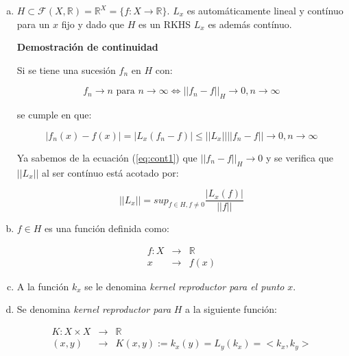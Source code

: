 \documentclass[12pt]{article}
\begin{document}
\begin{enumerate}[(a)]
\item {\color{red} $H \subset \mathcal{F}(X,\mathbb{R})=\mathbb{R}^X=\{f:X \rightarrow \mathbb{R}\}$}. $L_x$ es automáticamente lineal y contínuo para un $x$ fijo y dado que $H$ es un RKHS $L_x$ es además contínuo.

\textbf{Demostración de continuidad}

Si se tiene una sucesión ${f_n}$ en $H$ con:

\begin{equation}
\label{eq:cont1}
f_n \rightarrow n \text{ para } n \rightarrow \infty 
\Longleftrightarrow ||f_n-f||_H \rightarrow 0, n\rightarrow \infty
\end{equation}

se cumple en que:

\begin{equation*}
|f_n(x) - f(x) | = | L_x(f_n-f) | \leq ||L_x|| ||f_n-f|| \rightarrow 0, n\rightarrow \infty
\end{equation*}

Ya sabemos de la ecuación (\ref{eq:cont1}) que  $||f_n-f||_H \rightarrow 0$ y se verifica que $||L_x||$ al ser contínuo está acotado por:


\begin{equation*}
||L_x|| = sup_{f \in H,f \neq 0} \frac{|L_x(f)|}{||f||}
\end{equation*}



\item $f \in H$ es una función definida como:

\begin{eqnarray*}
f: X &\rightarrow &\mathbb{R} \\
 x &\rightarrow & f(x) 
\end{eqnarray*}



\item A la función $k_x$ se le denomina \textit{kernel reproductor para el punto} $x$. 


\item Se denomina \textit{kernel reproductor para} $H$ a la siguiente función:

\begin{eqnarray*}
K: X \times X &\rightarrow &\mathbb{R} \\
(x,y) &\rightarrow & K(x,y):= k_x(y) = L_y(k_x) = <k_x,k_y>
\end{eqnarray*}

\end{enumerate}
\end{document}
